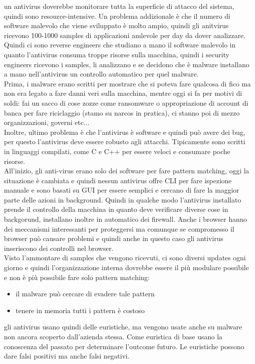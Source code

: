 \documentclass[12pt, oneside]{extbook} %
\begin{document}
un antivirus doverebbe monitorare tutta la superficie di attacco del sistema, quindi sono resource-intensive. Un problema addizionale è che il numero di software malevolo che viene sviluppato è molto ampio, quindi gli anitvirus ricevono 100-1000 samples di applicazioni amlevole per day da dover analizzare. Quindi ci sono reverse engineers che studiano a mano il software malevolo in quanto l'antivirus consuma troppe risorse sulla macchina, quindi i security engineers  ricevono i samples, li analizzano e se decidono che è malware installano a mano nell'antivirus un controllo automatico per quel malware.\\Prima, i malware erano scritti per mostrare che si poteva fare qualcosa di fico ma non era legato a fare danni veri sulla macchina, mentre oggi si fa per motivi di soldi: fai un sacco di cose zozze come ransomware o appropriazione di account di banca per fare riciclaggio (stamo su narcos in pratica), ci stanno poi di mezzo organizzazioni, governi etc...\\Inoltre, ultimo problema è che l'antivirus è software e quindi può avere dei bug, per questo l'antivirus deve essere robusto agli attacchi. Tipicamente sono scritti in linguaggi compilati, come C e C++ per essere veloci e consumare poche risorse.\\All'inizio, gli anti-virus erano solo dei software per fare pattern matching, oggi la situazione è cambiata e quindi nessun antivirus offre CLI per fare ispezione manuale e sono basati su GUI per essere semplici e cercano di fare la maggior parte delle azioni in background. Quindi in qualche modo l'antivirus installato prende il controllo della macchina in quanto deve verificare diverse cose in backgorund, installano inoltre in automatico dei firewall. Anche i browser hanno dei meccanismi interessanti per proteggersi ma comunque se compromesso il browser può causare problemi e quindi anche in questo caso gli antivirus inseriscono dei controlli nel browser.\\ Visto l'ammontare di samples che vengono ricevuti, ci sono diversi updates ogni giorno e quindi l'organizzazione interna dovrebbe essere il più modulare possibile e non è più possibile fare solo pattern matching:
\begin{itemize}
\item il malware può cercare di evadere tale pattern
\item tenere in memoria tutti i pattern è costoso
\end{itemize}
gli antivirus usano quindi delle euristiche, ma vengono usate anche su malware non ancora scoperto dall'azienda stessa. Come euristica di base usano la conoscenza del passato per determinare l'outcome futuro. Le euristiche possono dare falsi positivi ma anche falsi negativi.
\end{document}
